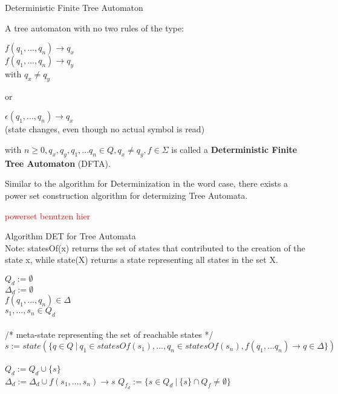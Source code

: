 \documentclass{llncs}
\begin{document}
\begin{definition}{Deterministic Finite Tree Automaton}

	A tree automaton with no two rules of the type:
	\begin{center}
		\(f(q_1,..., q_n) \rightarrow q_x\)\\
		\(f(q_1,...,q_n) \rightarrow q_y\)\\
		with \(q_x \neq q_y\) \\
	\end{center}
	or
	\begin{center}
		\(\epsilon(q_1, ..., q_n) \rightarrow q_x\)\\
		(state changes, even though no actual symbol is read)
	\end{center}
	with \(n \ge 0, q_x,q_y,q_1,...q_n \in Q, q_x \neq q_y, f \in \Sigma\)
	is called a \textbf{Deterministic Finite Tree Automaton} (DFTA).
\end{definition}

Similar to the algorithm for Determinization in the word case, there exists a power set construction algorithm for determizing Tree Automata.

\textcolor{red}{powerset benutzen hier}

\begin{definition}{Algorithm DET for Tree Automata \cite{tata-nfta}}\\
	Note: statesOf(x) returns the set of states that contributed to the creation of the state x, while state(X) returns a state representing all states in the set X.
\begin{algorithm}[H]
	\(Q_d := \emptyset\)\\
	\(\Delta_d := \emptyset\)
	\\
		 {
			\( f(q_1,...,q_n) \in \Delta\)\\
			\(s_1,...,s_n \in Q_d\)\\
			~\\
			/* meta-state representing the set of reachable states */ \\
			\( s := state(\{ q \in Q ~|~ q_1 \in statesOf(s_1),..., q_n \in statesOf(s_n), f(q_1,...q_n) \rightarrow q \in \Delta \}) \)\\~\\
			\(Q_d := Q_d \cup \{s\}\)\\
			\(\Delta_d := \Delta_d \cup f(s_1,...,s_n) \rightarrow s \)
		}
	\(Q_{f_d} := \{ s \in Q_d ~ | ~ \{s\} \cap Q_f \neq \emptyset \}\)\\
\end{algorithm}
\end{definition}
\end{document}

